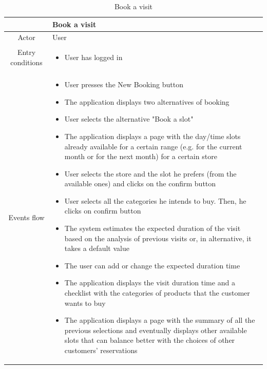\documentclass[table, 12pt]{article}
\begin{document}
\begin{longtable}{|c| p{10cm}|}
    \caption{Book a visit}                                                                                                                                          \\
    \hline
                     & Book a visit                                                                                                                                 \\
    \hline
    Actor            & User                                                                                                                                         \\
    \hline
    Entry conditions & \begin{itemize}
        \item User has logged in
    \end{itemize}                                                                                                                   \\
    \hline
    Events flow      & \begin{itemize}[nosep,after=\strut]
        \item User presses the New Booking button
        \item The application displays two alternatives of booking
        \item User selects the alternative "Book a slot"
        \item The application displays a page with the day/time slots already available for a certain range (e.g. for the current month or for the next month) for a certain store
        \item User selects the store and the slot he prefers (from the available ones) and clicks on the confirm button
        \item User selects all the categories he intends to buy. Then, he clicks on confirm button
        \item  The system estimates the expected duration of the visit based on the analysis of previous visits or, in alternative, it takes a default value
        \item The user can add or change the expected duration time
        \item The application displays the visit duration time and a checklist with the categories of products that the customer wants to buy
        \item The application displays a page with the summary of all the previous selections and eventually displays other available slots that can balance better with the choices of other customers' reservations

\end{itemize}
\end{longtable}
\end{document}

